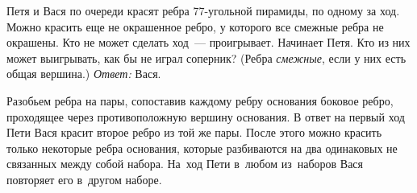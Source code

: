 \problem
Петя и Вася по очереди красят ребра 77-угольной пирамиды, по одному за ход.
Можно красить еще не окрашенное ребро, у которого все смежные ребра не
окрашены.
Кто не может сделать ход~--- проигрывает.
Начинает Петя.
Кто из них может выигрывать, как бы не играл соперник?
(Ребра \emph{смежные}, если у них есть общая вершина.)
\solution
\emph{Ответ:} Вася.
\par
Разобьем ребра на пары, сопоставив каждому ребру основания боковое ребро,
проходящее через противоположную вершину основания.
В ответ на первый ход Пети Вася красит второе ребро из той же пары.
После этого можно красить только некоторые ребра основания, которые разбиваются
на два одинаковых не связанных между собой набора.
На~ход Пети в~любом из~наборов Вася повторяет его в~другом наборе.
\endproblem
